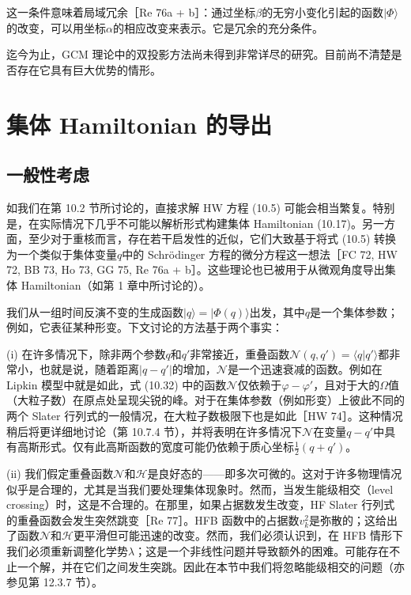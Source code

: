 这一条件意味着局域冗余［Re 76a + b］：通过坐标$\beta$的无穷小变化引起的函数$|\Phi\rangle$的改变，可以用坐标$\alpha$的相应改变来表示。它是冗余的充分条件。

迄今为止，GCM 理论中的双投影方法尚未得到非常详尽的研究。目前尚不清楚是否存在它具有巨大优势的情形。

\section{集体 Hamiltonian 的导出}

\subsection{一般性考虑}

如我们在第 10.2 节所讨论的，直接求解 HW 方程 (10.5) 可能会相当繁复。特别是，在实际情况下几乎不可能以解析形式构建集体
Hamiltonian (10.17)。另一方面，至少对于重核而言，存在若干启发性的近似，它们大致基于将式 (10.5) 转换为一个类似于集体变量$q$中的
Schrödinger 方程的微分方程这一想法［FC 72, HW 72, BB 73, Ho 73, GG 75, Re 76a
+ b］。这些理论也已被用于从微观角度导出集体 Hamiltonian（如第 1 章中所讨论的）。

我们从一组时间反演不变的生成函数$|q\rangle=|\Phi(q)\rangle$出发，其中$q$是一个集体参数；例如，它表征某种形变。下文讨论的方法基于两个事实：

(i) 在许多情况下，除非两个参数$q$和$q'$非常接近，重叠函数$\mathscr{N}(q,q')=\langle q|q'\rangle$都非常小，也就是说，随着距离$|q-q'|$的增加，$\mathscr{N}$是一个迅速衰减的函数。例如在
Lipkin 模型中就是如此，式 (10.32) 中的函数$\mathscr{N}$仅依赖于$\varphi-\varphi'$，且对于大的$\Omega$值（大粒子数）在原点处呈现尖锐的峰。对于在集体参数（例如形变）上彼此不同的两个
Slater 行列式的一般情况，在大粒子数极限下也是如此［HW 74］。这种情况稍后将更详细地讨论（第 10.7.4 节），并将表明在许多情况下$\mathscr{N}$在变量$q-q'$中具有高斯形式。仅有此高斯函数的宽度可能仍依赖于质心坐标$\frac{1}{2}(q+q')$。

(ii) 我们假定重叠函数$\mathscr{N}$和$\mathscr{H}$是良好态的——即多次可微的。这对于许多物理情况似乎是合理的，尤其是当我们要处理集体现象时。然而，当发生能级相交（level
crossing）时，这是不合理的。在那里，如果占据数发生改变，HF Slater 行列式的重叠函数会发生突然跳变［Re 77］。HFB
函数中的占据数$v^{2}_{k}$是弥散的；这给出了函数$\mathscr{N}$和$\mathscr{H}$更平滑但可能迅速的改变。然而，我们必须认识到，在
HFB 情形下我们必须重新调整化学势$\lambda$；这是一个非线性问题并导致额外的困难。可能存在不止一个解，并在它们之间发生突跳。因此在本节中我们将忽略能级相交的问题（亦参见第
12.3.7 节）。

